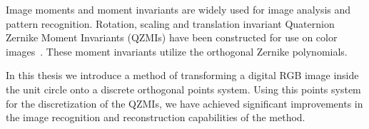 Image moments and moment invariants are widely used for image analysis and pattern recognition. Rotation, scaling and translation invariant Quaternion Zernike Moment Invariants (QZMIs) have been constructed for use on color images~\cite{qzmi}. These moment invariants utilize the orthogonal Zernike polynomials. 

In this thesis we introduce a method of transforming a digital RGB image inside the unit circle onto a discrete orthogonal points system. Using this points system for the discretization of the QZMIs, we have achieved significant improvements in the image recognition and reconstruction capabilities of the method. 

